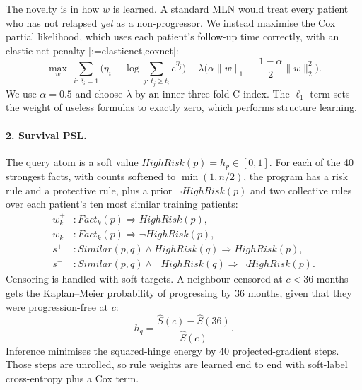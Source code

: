 \documentclass{mnnit}
\makeatletter
\newcommand{\rc}[1]{[\def\rc@sep{}\@for\rc@key:=#1\do{\rc@sep\ref{ref:\rc@key}\def\rc@sep{, }}]}
\makeatother
\begin{document}
The novelty is in how $w$ is learned. A standard MLN would treat every patient who has not relapsed \emph{yet} as a
non-progressor. We instead maximise the Cox partial likelihood, which uses each patient's follow-up time correctly, with
an elastic-net penalty \rc{elasticnet,coxnet}:
\begin{equation}
  \max_{w}\ \sum_{i:\,\delta_i=1}\Big(\eta_i-\log\!\sum_{j:\,t_j\ge t_i}e^{\eta_j}\Big)-\lambda\Big(\alpha\|w\|_1+\frac{1-\alpha}{2}\|w\|_2^2\Big).
\end{equation}
We use $\alpha=0.5$ and choose $\lambda$ by an inner three-fold C-index. The $\ell_1$ term sets the weight of useless
formulas to exactly zero, which performs structure learning.

\paragraph{2. Survival PSL.} The query atom is a soft value $\mathit{HighRisk}(p)=h_p\in[0,1]$. For each of the 40 strongest
facts, with counts softened to $\min(1,n/2)$, the program has a risk rule and a protective rule, plus a prior
$\neg\mathit{HighRisk}(p)$ and two collective rules over each patient's ten most similar training patients:
\begin{align}
  w^+_k &: \mathit{Fact}_k(p)\Rightarrow\mathit{HighRisk}(p), \nonumber\\
  w^-_k &: \mathit{Fact}_k(p)\Rightarrow\neg\mathit{HighRisk}(p), \nonumber\\
  s^+ &: \mathit{Similar}(p,q)\wedge\mathit{HighRisk}(q)\Rightarrow\mathit{HighRisk}(p), \nonumber\\
  s^- &: \mathit{Similar}(p,q)\wedge\neg\mathit{HighRisk}(q)\Rightarrow\neg\mathit{HighRisk}(p).
\end{align}
Censoring is handled with soft targets. A neighbour censored at $c<36$ months gets the Kaplan--Meier probability of
progressing by 36 months, given that they were progression-free at $c$:
\begin{equation}
  h_q=\frac{\hat S(c)-\hat S(36)}{\hat S(c)}.
\end{equation}
Inference minimises the squared-hinge energy by 40 projected-gradient steps. Those steps are unrolled, so rule weights
are learned end to end with soft-label cross-entropy plus a Cox term.
\end{document}
